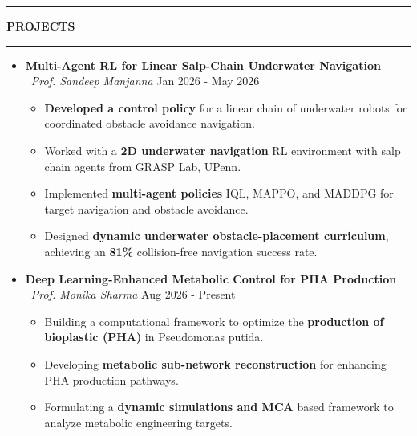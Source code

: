 \documentclass[letterpaper,9pt]{article}
\begin{document}
\begin{itemize}[leftmargin=0pt, parsep=0pt, itemsep=0.4em]
\begin{itemize}[leftmargin=0pt, parsep=0pt, itemsep=0.2em]
\end{itemize}

\vspace{0.3em}

\noindent
\begin{center}
    \rule[0.5ex]{0.42\linewidth}{0.5pt}
    \hspace{0.5em}
    \textbf{PROJECTS}
    \hspace{0.5em}
    \rule[0.5ex]{0.42\linewidth}{0.5pt}
\end{center}

\begin{itemize}[leftmargin=0pt, parsep=0pt, itemsep=0.8em]

\item[] \textbf{Multi-Agent RL for Linear Salp-Chain Underwater Navigation} \textbar\ \textit{Prof. Sandeep Manjanna} \hfill Jan 2026 - May 2026
{\small
\begin{itemize}[leftmargin=1em, label=\textbullet, itemsep=0.2pt, parsep=0pt, topsep=1pt]
    \item \textbf{Developed a control policy} for a linear chain of underwater robots for coordinated obstacle avoidance navigation. 
    \item Worked with a \textbf{2D underwater navigation} RL environment with salp chain agents from GRASP Lab, UPenn.
    \item Implemented \textbf{multi-agent policies} IQL, MAPPO, and MADDPG for target navigation and obstacle avoidance.
    \item Designed \textbf{dynamic underwater obstacle-placement curriculum}, achieving an \textbf{81\%} collision-free navigation success rate.
\end{itemize}
}

\item[] \textbf{Deep Learning-Enhanced Metabolic Control for PHA Production} \textbar\ \textit{Prof. Monika Sharma} \hfill Aug 2026 - Present
{\small
\begin{itemize}[leftmargin=1em, label=\textbullet, itemsep=0.2pt, parsep=0pt, topsep=1pt]
    \item Building a computational framework to optimize the \textbf{production of bioplastic (PHA)} in Pseudomonas putida.
    \item Developing \textbf{metabolic sub-network reconstruction} for enhancing PHA production pathways.
    \item Formulating a \textbf{dynamic simulations and MCA} based framework to analyze metabolic engineering targets. 
\end{itemize}
}


\end{itemize}
\end{itemize}
\end{document}
